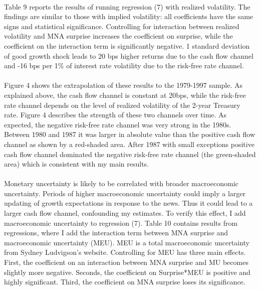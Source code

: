 \documentclass[12pt]{article}
\begin{document}
\paragraph{}
Table 9 reports the results of running regression (7) with realized volatility. The findings are similar to those with implied volatility: all coefficients have the same signs and statistical significance. Controlling for interaction between realized volatility and MNA surprise increases the coefficient on surprise, while the coefficient on the interaction term is significantly negative. 1 standard deviation of good growth shock leads to 20 bps higher returns due to the cash flow channel and -16 bps per 1\% of interest rate volatility due to the risk-free rate channel. 
\paragraph{}
Figure 4 shows the extrapolation of these results to the 1979-1997 sample. As explained above, the cash flow channel is constant at 20bps, while the risk-free rate channel depends on the level of realized volatility of the 2-year Treasury rate. Figure 4 describes the strength of these two channels over time. As expected, the negative risk-free rate channel was very strong in the 1980s. Between 1980 and 1987 it was larger in absolute value than the positive cash flow channel as shown by a red-shaded area. After 1987 with small exceptions positive cash flow channel dominated the negative risk-free rate channel (the green-shaded area) which is consistent with my main results.
\paragraph{}
Monetary uncertainty is likely to be correlated with broader macroeconomic uncertainty. Periods of higher macroeconomic uncertainty could imply a larger updating of growth expectations in response to the news. Thus it could lead to a larger cash flow channel, confounding my estimates. To verify this effect, I add macroeconomic uncertainty to regression (7). Table 10 contains results from regressions, where I add the interaction term between MNA surprise and macroeconomic uncertainty (MEU). MEU is a total macroeconomic uncertainty from Sydney Ludvigson's website. Controlling for MEU has three main effects. First, the coefficient on an interaction between MNA surprise and MU becomes slightly more negative. Seconds, the coefficient on Surprise*MEU is positive and highly significant. Third, the coefficient on MNA surprise loses its significance.
\end{document}
